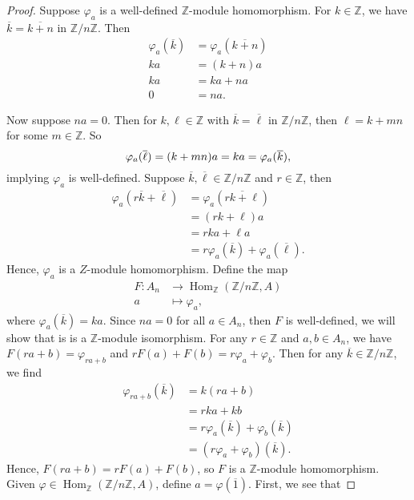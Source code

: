 \documentclass[12pt]{article}
\theoremstyle{definition}
\newcommand{\Z}{\mathbb{Z}}
\renewcommand{\phi}{\varphi}
\newcommand{\eqc}{\overline}
\newcommand{\Hom}{\operatorname{Hom}}
\begin{document}
\begin{proof}
    Suppose $\phi_a$ is a well-defined $\Z$-module homomorphism. For $k \in \Z$, we have $\eqc{k} = \eqc{k + n}$ in $\Z/n\Z$. Then
    \begin{align*}
        \phi_a(\eqc{k}) &= \phi_a(\eqc{k + n}) \\
        ka &= (k + n)a \\
        ka &= ka + na \\
        0 &= na.
    \end{align*}
    
    Now suppose $na = 0$. Then for $k, \ell \in \Z$ with $\eqc{k} = \eqc{\ell}$ in $\Z/n\Z$, then $\ell = k + mn$ for some $m \in \Z$. So
    \[
        \phi_a(\eqc{\ell})
            = (k + mn)a \\
            = ka \\
            = \phi_a(\eqc{k}),
    \]
    implying $\phi_a$ is well-defined. Suppose $\eqc{k}, \eqc{\ell} \in \Z/n\Z$ and $r \in \Z$, then
    \begin{align*}
        \phi_a(r\eqc{k} + \eqc{\ell})
            &= \phi_a(\eqc{rk + \ell}) \\
            &= (rk + \ell)a \\
            &= rka + \ell a \\
            &= r\phi_a(\eqc{k}) + \phi_a(\eqc{\ell}).
    \end{align*}
    Hence, $\phi_a$ is a $Z$-module homomorphism. Define the map
    \begin{align*}
        F : A_n &\to \Hom_\Z(\Z/n\Z, A) \\
            a &\mapsto \phi_a,
    \end{align*}
    where $\phi_a(\eqc{k}) = ka$. Since $na = 0$ for all $a \in A_n$, then $F$ is well-defined, we will show that is is a $\Z$-module isomorphism. For any $r \in \Z$ and $a, b \in A_n$, we have $F(ra + b) = \phi_{ra + b}$ and $rF(a) + F(b) = r\phi_a + \phi_b$. Then for any $\eqc{k} \in \Z/n\Z$, we find
    \begin{align*}
        \phi_{ra+b}(\eqc{k})
            &= k(ra + b) \\
            &= rka + kb \\
            &= r\phi_a(\eqc{k}) + \phi_b(\eqc{k}) \\
            &= (r\phi_a + \phi_b)(\eqc{k}).
    \end{align*}
    Hence, $F(ra + b) = rF(a) + F(b)$, so $F$ is a $\Z$-module homomorphism. Given $\phi \in \Hom_\Z(\Z/n\Z, A)$, define $a = \phi(\eqc{1})$. First, we see that

\end{proof}
\end{document}

